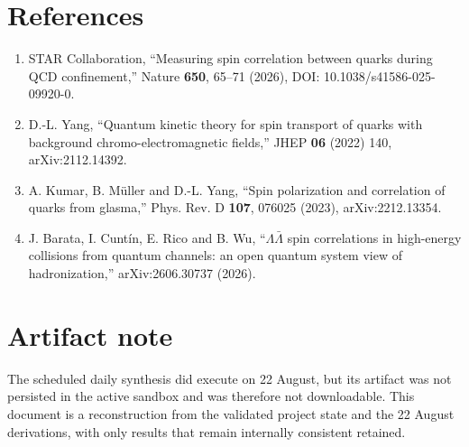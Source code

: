 \documentclass[11pt]{article}
\begin{document}
\section*{References}

\begin{enumerate}[leftmargin=1.5em]
\item STAR Collaboration, ``Measuring spin correlation between quarks during QCD confinement,''
Nature \textbf{650}, 65--71 (2026), DOI: 10.1038/s41586-025-09920-0.
\item D.-L. Yang, ``Quantum kinetic theory for spin transport of quarks with background
chromo-electromagnetic fields,'' JHEP \textbf{06} (2022) 140,
arXiv:2112.14392.
\item A. Kumar, B. M\"uller and D.-L. Yang,
``Spin polarization and correlation of quarks from glasma,''
Phys. Rev. D \textbf{107}, 076025 (2023), arXiv:2212.13354.
\item J. Barata, I. Cunt\'in, E. Rico and B. Wu,
``$\Lambda\bar\Lambda$ spin correlations in high-energy collisions from quantum channels:
an open quantum system view of hadronization,'' arXiv:2606.30737 (2026).
\end{enumerate}

\section*{Artifact note}

The scheduled daily synthesis did execute on 22 August, but its artifact was not persisted in the
active sandbox and was therefore not downloadable. This document is a reconstruction from the
validated project state and the 22 August derivations, with only results that remain internally
consistent retained.
\end{document}
